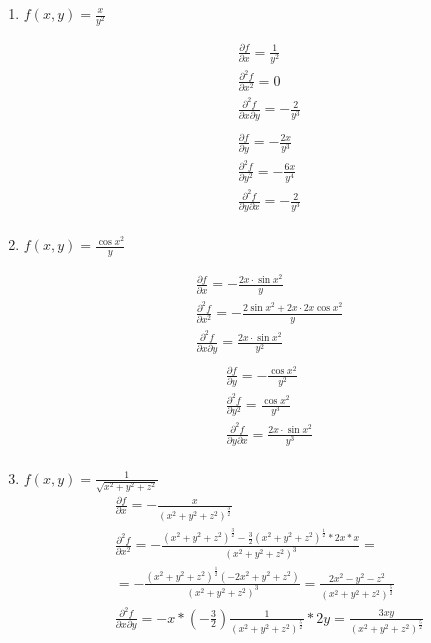 \documentclass[a4paper, 12pt]{article}
\begin{document}
\begin{enumerate}
  \item %
$f(x, y) = \frac{x}{y^2}$ \\
\begin{paracol}{2}
\begin{align*}
  &\frac{\partial f}{\partial x} = \frac{1}{y^2} \\
  &\frac{\partial^2 f}{\partial x^2} = 0 \\
  &\frac{\partial^2 f}{\partial x \partial y} = -\frac{2}{y^3} \\
\end{align*}
\switchcolumn%
\begin{align*}
  &\frac{\partial f}{\partial y} = -\frac{2x}{y^3}\\
  &\frac{\partial^2 f}{\partial y^2} = -\frac{6x}{y^4} \\
  &\frac{\partial^2 f}{\partial y \partial x} = -\frac{2}{y^3}\\
\end{align*}
\end{paracol}

  \item %
$f(x, y) = \frac{\cos x^2}{y}$ \\
\begin{paracol}{2}
\begin{align*}
  &\frac{\partial f}{\partial x} = -\frac{2x\cdot \sin x^2}{y} \\
  &\frac{\partial^2 f}{\partial x^2} = -\frac{2\sin x^2 + 2x\cdot 2x\cos x^2}{y} \\
  &\frac{\partial^2 f}{\partial x \partial y} = \frac{2x\cdot \sin x^2}{y^2} \\
\end{align*}
\switchcolumn%
\begin{align*}
  &\frac{\partial f}{\partial y} = -\frac{\cos x^2}{y^2} \\
  &\frac{\partial^2 f}{\partial y^2} = \frac{\cos x^2}{y^3} \\
  &\frac{\partial^2 f}{\partial y \partial x} = \frac{2x\cdot \sin x^2}{y^3} \\
\end{align*}
\end{paracol}

  \item %
$f(x, y) = \frac{1}{\sqrt{x^2+y^2+z^2}}$ \\
\begin{align*}
 &\frac{\partial f}{\partial x} = -\frac{x}{(x^2+y^2+z^2)^\frac{3}{2}} \\ 
    &\frac{\partial^2 f}{\partial x^2} = -\frac{(x^2+y^2+z^2)^\frac{3}{2} - \frac{3}{2}(x^2+y^2+z^2)^\frac{1}{2}*2x*x}{(x^2+y^2+z^2)^3} = \\
    &=-\frac{(x^2+y^2+z^2)^\frac{1}{2}(-2x^2+y^2+z^2)}{(x^2+y^2+z^2)^3} =
    \frac{2x^2-y^2-z^2}{(x^2+y^2+z^2)^\frac{5}{2}} \\
    &\frac{\partial^2 f}{\partial x \partial y} = -x*(-\frac{3}{2})\frac{1}{(x^2+y^2+z^2)^\frac{5}{2}}*2y = \frac{3xy}{(x^2+y^2+z^2)^\frac{5}{2}} \\
\end{align*}


\end{enumerate}
\end{document}
